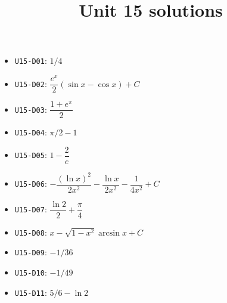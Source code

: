 
\title{Unit 15 solutions}

\maketitle
\begin{itemize}
  \item \texttt{U15-D01}: $1/4$
  \item \texttt{U15-D02}: $\dfrac{e^{x}}{2}(\sin x-\cos x)+C$
  \item \texttt{U15-D03}: $\dfrac{1+e^{\pi}}{2}$
  \item \texttt{U15-D04}: $\pi/2-1$
  \item \texttt{U15-D05}: $1-\dfrac{2}{e}$
  \item \texttt{U15-D06}: $-\dfrac{(\ln x)^{2}}{2x^{2}}-\dfrac{\ln x}{2x^{2}}-\dfrac{1}{4x^{2}}+C$
  \item \texttt{U15-D07}: $\dfrac{\ln 2}{2}+\dfrac{\pi}{4}$
  \item \texttt{U15-D08}: $x-\sqrt{1-x^{2}}\arcsin x+C$
  \item \texttt{U15-D09}: $-1/36$
  \item \texttt{U15-D10}: $-1/49$
  \item \texttt{U15-D11}: $5/6-\ln 2$
\end{itemize}

